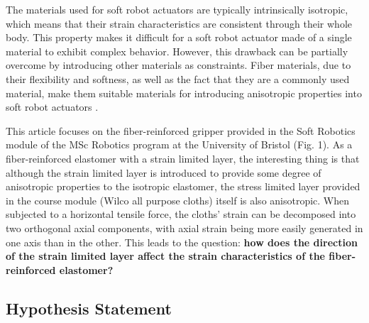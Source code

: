 \documentclass[conference]{IEEEtran}
\begin{document}
The materials used for soft robot actuators are typically intrinsically isotropic, which means that their strain characteristics are consistent through their whole body. This property makes it difficult for a soft robot actuator made of a single material to exhibit complex behavior. However, this drawback can be partially overcome by introducing other materials as constraints. Fiber materials, due to their flexibility and softness, as well as the fact that they are a commonly used material, make them suitable materials for introducing anisotropic properties into soft robot actuators \cite{overview}.



This article focuses on the fiber-reinforced gripper provided in the Soft Robotics module of the MSc Robotics program at the University of Bristol (Fig. 1). As a fiber-reinforced elastomer with a strain limited layer\cite{stress_constraint_layer}, the interesting thing is that although the strain limited layer is introduced to provide some degree of anisotropic properties to the isotropic elastomer, the stress limited layer provided in the course module  (Wilco all purpose cloths) itself is also anisotropic. When subjected to a horizontal tensile force, the cloths' strain can be decomposed into two orthogonal axial components, with axial strain being more easily generated in one axis than in the other. This leads to the question: \textbf{how does the direction of the strain limited layer affect the strain characteristics of the fiber-reinforced elastomer?}





\subsection{Hypothesis Statement}
\label{Hypothesis}

\end{document}
